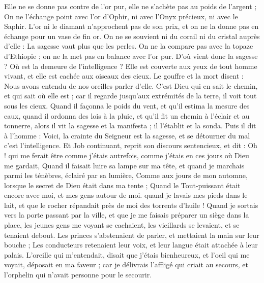 \begin{multicols}{2}
{Elle ne se donne pas contre de l'or pur, elle ne s'achète pas au poids de l'argent ;
On ne l'échange point avec l'or d'Ophir, ni avec l'Onyx précieux, ni avec le Saphir.
L'or ni le diamant n'approchent pas de son prix, et on ne la donne pas en échange pour un vase de fin or.
On ne se souvient ni du corail ni du cristal auprès d'elle : La sagesse vaut plus que les perles.
On ne la compare pas avec la topaze d'Ethiopie ; on ne la met pas en balance avec l'or pur.
D'où vient donc la sagesse ? Où est la demeure de l'intelligence ?
Elle est couverte aux yeux de tout homme vivant, et elle est cachée aux oiseaux des cieux.
Le gouffre et la mort disent : Nous avons entendu de nos oreilles parler d'elle.
C'est Dieu qui en sait le chemin, et qui sait où elle est ;
car il regarde jusqu'aux extrémités de la terre, il voit tout sous les cieux.
Quand il façonna le poids du vent, et qu'il estima la mesure des eaux,
quand il ordonna des lois à la pluie, et qu'il fit un chemin à l'éclair et au tonnerre,
alors il vit la sagesse et la manifesta ; il l'établit et la sonda.
Puis il dit à l'homme : Voici, la crainte du Seigneur est la sagesse, et se détourner du mal c'est l'intelligence.
\VerseOne{} Et Job continuant, reprit son discours sentencieux, et dit :
Oh ! qui me ferait être comme j'étais autrefois, comme j'étais en ces jours où Dieu me gardait,
Quand il faisait luire sa lampe sur ma tête, et quand je marchais parmi les ténèbres, éclairé par sa lumière,
 Comme aux jours de mon automne, lorsque le secret de Dieu était dans ma tente ;
Quand le Tout-puissant était encore avec moi, et mes gens autour de moi.
quand je lavais mes pieds dans le lait, et que le rocher répandait près de moi des torrents d'huile !
Quand je sortais vers la porte passant par la ville, et que je me faisais préparer un siège dans la place,
les jeunes gens me voyant se cachaient, les vieillards se levaient, et se tenaient debout.
Les princes s'abstenaient de parler, et mettaient la main sur leur bouche ;
Les conducteurs retenaient leur voix, et leur langue était attachée à leur palais.
L'oreille qui m'entendait, disait que j'étais bienheureux, et l'oeil qui me voyait, déposait en ma faveur ;
car je délivrais l'affligé qui criait au secours, et l'orphelin qui n'avait personne pour le secourir.
}
\end{multicols}
